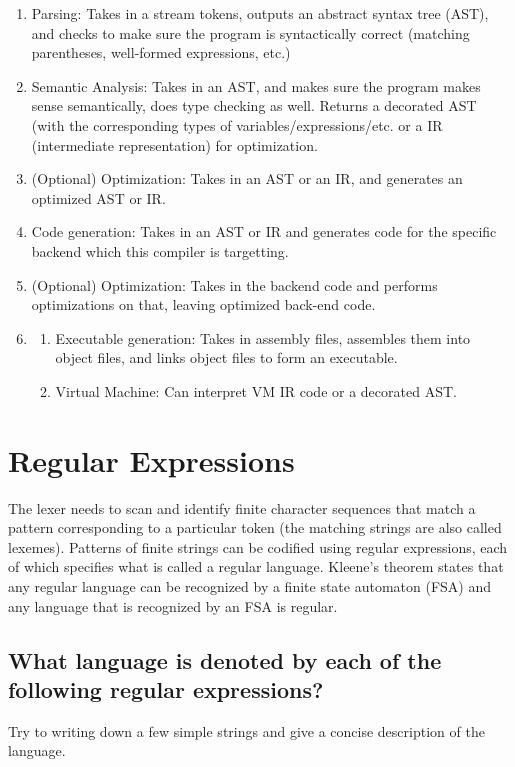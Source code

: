 \documentclass[a4paper]{exam}
\begin{document}
\begin{solution}
  \begin{enumerate}
    \item Parsing: Takes in a stream tokens, outputs an abstract syntax tree (AST), and checks to make sure the program is syntactically correct (matching parentheses, well-formed expressions, etc.)
    \item Semantic Analysis: Takes in an AST, and makes sure the program makes sense semantically, does type checking as well. Returns a decorated AST (with the corresponding types of variables/expressions/etc. or a IR (intermediate representation) for optimization.
    \item (Optional) Optimization: Takes in an AST or an IR, and generates an optimized AST or IR.
    \item Code generation: Takes in an AST or IR and generates code for the specific backend which this compiler is targetting.
    \item (Optional) Optimization: Takes in the backend code and performs optimizations on that, leaving optimized back-end code.
    \item \begin{enumerate}
            \item Executable generation: Takes in assembly files, assembles them into object files, and links object files to form an executable.
            \item Virtual Machine: Can interpret VM IR code or a decorated AST.
          \end{enumerate}
  \end{enumerate}
\end{solution}



\section{Regular Expressions}
The lexer needs to scan and identify finite character sequences that match a pattern corresponding to a particular token (the matching strings are also called lexemes). Patterns of finite strings can be codified using regular expressions, each of which specifies what is called a regular language. Kleene’s theorem states that any regular language can be recognized by a finite state automaton (FSA) and any language that is recognized by an FSA is regular.


\subsection{What language is denoted by each of the following regular expressions?}
Try to writing down a few simple strings and give a concise description of the language.
\end{document}
